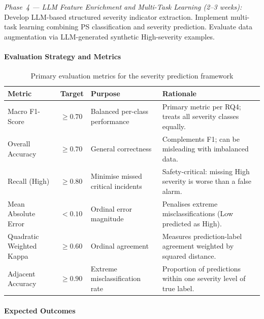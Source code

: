 \documentclass[11pt, titlepage, bibliography=totoc]{scrreprt}
\begin{document}
\textit{Phase~4 --- LLM Feature Enrichment and Multi-Task Learning (2--3 weeks):} Develop LLM-based structured severity indicator extraction. Implement multi-task learning combining PS classification and severity prediction. Evaluate data augmentation via LLM-generated synthetic High-severity examples.

\paragraph{Evaluation Strategy and Metrics}

\begin{table}[H]
\centering
\caption{Primary evaluation metrics for the severity prediction framework}
\label{tab:severity_metrics}
\begin{tabular}{llll}
\toprule
\textbf{Metric} & \textbf{Target} & \textbf{Purpose} & \textbf{Rationale} \\
\midrule
Macro F1-Score       & $\geq 0.70$ & Balanced per-class performance  & Primary metric per RQ4; treats all severity classes equally. \\
Overall Accuracy     & $\geq 0.70$ & General correctness             & Complements F1; can be misleading with imbalanced data. \\
Recall (High)        & $\geq 0.80$ & Minimise missed critical incidents & Safety-critical: missing High severity is worse than a false alarm. \\
Mean Absolute Error  & $< 0.10$    & Ordinal error magnitude         & Penalises extreme misclassifications (Low predicted as High). \\
Quadratic Weighted Kappa & $\geq 0.60$ & Ordinal agreement           & Measures prediction-label agreement weighted by squared distance. \\
Adjacent Accuracy    & $\geq 0.90$ & Extreme misclassification rate  & Proportion of predictions within one severity level of true label. \\
\bottomrule
\end{tabular}
\end{table}

\paragraph{Expected Outcomes}
\end{document}
